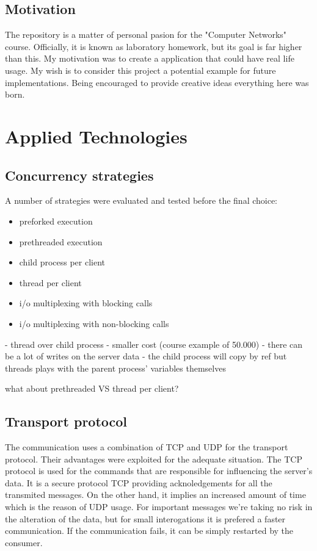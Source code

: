 \documentclass[runningheads]{llncs}
\begin{document}
\subsection{Motivation}

The repository is a matter of personal pasion for the "Computer Networks" course. Officially, it is known as laboratory homework, but its goal is far higher than this. My motivation was to create a application that could have real life usage. My wish is to consider this project a potential example for future implementations. Being encouraged to provide creative ideas everything here was born.

\section{Applied Technologies}

\subsection{Concurrency strategies}

A number of strategies were evaluated and tested before the final choice:
\begin{itemize}
    \item preforked execution 
    \item prethreaded execution 
    \item child process per client
    \item thread per client
    \item i/o multiplexing with blocking calls
    \item i/o multiplexing with non-blocking calls
\end{itemize}

- thread over child process
	- smaller cost (course example of 50.000)
	- there can be a lot of writes on the server data
	- the child process will copy by ref but threads plays with the parent process' variables themselves

what about prethreaded VS thread per client?

\subsection{Transport protocol}

The communication uses a combination of TCP and UDP for the transport protocol. Their advantages were exploited for the adequate situation.
The TCP protocol is used for the commands that are responsible for influencing the server's data. It is a secure protocol TCP providing acknoledgements for all the transmited messages. On the other hand, it implies an increased amount of time which is the reason of UDP usage. For important messages we're taking no risk in the alteration of the data, but for small interogations it is prefered a faster communication. If the communication fails, it can be simply restarted by the consumer. 
\end{document}

